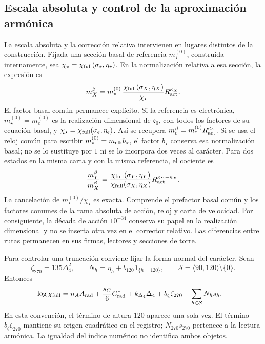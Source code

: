 \subsection{Escala absoluta y control de la aproximación armónica}
\label{subsec:vi-precision-torres}

La escala absoluta y la corrección relativa intervienen en lugares
distintos de la construcción. Fijada una sección basal de referencia
\(m_\star^{(0)}\), construida internamente, sea
\(\chi_\star=\chi_{\rm full}(\sigma_\star,\eta_\star)\).
En la normalización relativa a esa sección, la expresión es
\[
 m_X^\beta=m_\star^{(0)}\,
 \frac{\chi_{\rm full}(\sigma_X,\eta_X)}{\chi_\star}
 R_{\rm act}^{\kappa_X}.
\]
El factor basal común permanece explícito. Si la referencia es electrónica,
\(m_\star^{(0)}=m_e^{(0)}\) es la realización dimensional de
\(\mathfrak e_0\), con todos los factores de su ecuación basal, y
\(\chi_\star=\chi_{\rm full}(\sigma_e,\eta_e)\). Así se recupera
\(m_e^\beta=m_e^{(0)}R_{\rm act}^{\kappa_e}\). Si se usa el reloj
común para escribir \(m_\star^{(0)}=m_{\rm clk}b_\star\), el
factor \(b_\star\) conserva esa normalización basal; no se lo sustituye
por \(1\) ni se lo incorpora dos veces al carácter. Para dos estados
en la misma carta y con la misma referencia, el cociente es
\[
 \frac{m_Y^\beta}{m_X^\beta}
 =\frac{\chi_{\rm full}(\sigma_Y,\eta_Y)}
        {\chi_{\rm full}(\sigma_X,\eta_X)}
     R_{\rm act}^{\kappa_Y-\kappa_X}.
\]
La cancelación de \(m_\star^{(0)}/\chi_\star\) es exacta. Comprende
el prefactor basal común y los factores comunes de la rama absoluta de
acción, reloj y carta de velocidad. Por
consiguiente, la década de acción \(10^{-34}\) conserva su papel en
la realización dimensional y no se inserta otra vez en el corrector
relativo. Las diferencias entre rutas permanecen en sus firmas, lectores
y secciones de torre.

Para controlar una truncación conviene fijar la forma normal del carácter.
Sean
\[
 \zeta_{270}=135\Delta_4^2,\qquad
 N_h=\eta_h+b_{120}\mathbf 1_{\{h=120\}},\qquad
 \mathcal S=\langle90,120\rangle\setminus\{0\}.
\]
Entonces
\[
\begin{split}
 \log\chi_{\rm full}
 ={}&n_AA_{\rm rad}+\frac{s_C}{6}C^*_{\rm rad}
       +k_{\Delta_4}\Delta_4+b_\zeta\zeta_{270}
       +\sum_{h\in\mathcal S}N_hs_h .
\end{split}
\]
En esta convención, el término de altura \(120\) aparece una sola vez.
El término \(b_\zeta\zeta_{270}\) mantiene su origen cuadrático en el
registro; \(N_{270}s_{270}\) pertenece a la lectura armónica. La
igualdad del índice numérico no identifica ambos objetos.

